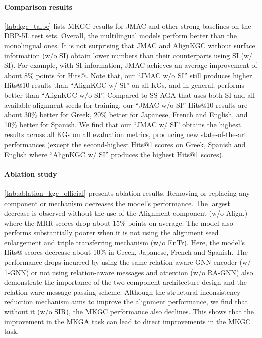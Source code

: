 \documentclass[11pt]{article}
\begin{document}
\paragraph{Comparison results} \autoref{tab:kgc_talbe} lists MKGC results for JMAC and other strong baselines on the DBP-5L test sets. 
Overall, the multilingual models perform better than the monolingual ones.
It is not surprising that  JMAC and AlignKGC without surface information (w/o SI) obtain lower numbers than their counterparts using SI (w/ SI). For example, with SI information, JMAC achieves an average improvement of about 8\% points for Hits@. Note that, our ``{JMAC} w/o SI'' still produces higher Hits@10 results than ``AlignKGC w/ SI'' on all KGs, and in general, performs better than ``AlignKGC w/o SI''.  Compared to {SS-AGA} that uses both SI and all available alignment seeds for training, our ``{JMAC} w/o SI'' Hits@10 results are about 30\% better for Greek, 20\% better for Japanese, French and English, and 10\% better for Spanish. We find that our ``{JMAC} w/ SI''  obtains the highest results across all KGs on all evaluation metrics, producing new state-of-the-art performances (except the second-highest Hits@1 scores on Greek, Spanish and English where ``AlignKGC w/ SI'' produces the highest Hits@1 scores). 


\paragraph{Ablation study} \autoref{tab:ablation_kgc_official} presents ablation results. Removing or replacing any component or mechanism decreases the model's performance. 
The largest decrease is observed without the use of the Alignment component (w/o Align.) where the MRR scores drop about 15\% points on average. The model also performs substantially poorer when it is not using the alignment seed enlargement and triple transferring mechanism (w/o EnTr). Here, the model's Hits@ scores decrease about 10\% in Greek, Japanese, French and Spanish. The performance drops incurred by using the same relation-aware GNN encoder (w/ 1-GNN) or not using relation-aware messages and attention (w/o RA-GNN) also demonstrate the importance of the two-component architecture design and the relation-ware message passing scheme. Although the structural inconsistency reduction mechanism aims to improve the alignment performance, we find that without it (w/o SIR), the MKGC performance also declines. This shows that the improvement in the MKGA task can lead to direct improvements in the MKGC task. 
\end{document}
